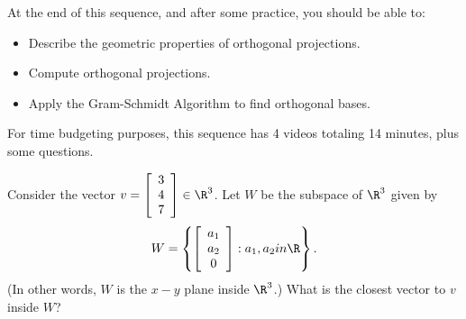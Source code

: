 







At the end of this sequence, and after some practice, you should be able to:

\begin{itemize}
\item Describe the geometric properties of orthogonal projections.  
\item Compute orthogonal projections.  
\item Apply the Gram-Schmidt Algorithm to find orthogonal bases. 
\end{itemize}

For time budgeting purposes, this sequence has 4 videos totaling 14 minutes, 
plus some questions.  



\endedxtext

\endedxvertical






Consider the vector $v = 
 \left[\begin{array}{c}
3 \\
4 \\
7
\end{array} \right] \in \R^3$.  Let $W$ be the subspace of $\R^3$ given by 
\[ W = \left\{  \left[\begin{array}{c}
a_1 \\
a_2 \\
0
\end{array} \right] : a_1, a_2 
in \R \right\}. \]
(In other words, $W$ is the $x-y$ plane inside $\R^3$.)  What is the closest vector to $v$ inside $W$?  

\begin{center}
   
\end{center}






\edXsolution{ 
}


\endedxproblem



